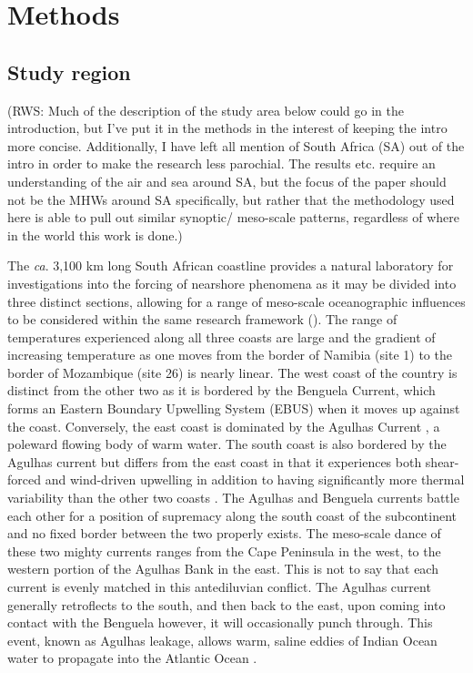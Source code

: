 \documentclass[a4paper,10pt,review]{elsarticle}
\begin{document}
\section{Methods}
\subsection{Study region}
(RWS: Much of the description of the study area below could go in the introduction, but I've put it in the methods in the interest of keeping the intro more concise. Additionally, I have left all mention of South Africa (SA) out of the intro in order to make the research less parochial. The results etc. require an understanding of the air and sea around SA, but the focus of the paper should not be the MHWs around SA specifically, but rather that the methodology used here is able to pull out similar synoptic/ meso-scale patterns, regardless of where in the world this work is done.)

The \emph{ca}. 3,100 km long South African coastline provides a natural laboratory for investigations into the forcing of nearshore phenomena as it may be divided into three distinct sections, allowing for a range of meso-scale oceanographic influences to be considered within the same research framework (). The range of temperatures experienced along all three coasts are large and the gradient of increasing temperature as one moves from the border of Namibia (site 1) to the border of Mozambique (site 26) is nearly linear. The west coast of the country is distinct from the other two as it is bordered by the Benguela Current, which forms an Eastern Boundary Upwelling System (EBUS) \citep{Hutchings2009} when it moves up against the coast. Conversely, the east coast is dominated by the Agulhas Current \citep{Luning1990}, a poleward flowing body of warm water. The south coast is also bordered by the Agulhas current but differs from the east coast in that it experiences both shear-forced and wind-driven upwelling \citep{Lutjeharms2000a} in addition to having significantly more thermal variability than the other two coasts \citep{Schlegel2017}. The Agulhas and Benguela currents battle each other for a position of supremacy along the south coast of the subcontinent and no fixed border between the two properly exists. The meso-scale dance of these two mighty currents ranges from the Cape Peninsula in the west, to the western portion of the Agulhas Bank in the east. This is not to say that each current is evenly matched in this antediluvian conflict. The Agulhas current generally retroflects to the south, and then back to the east, upon coming into contact with the Benguela \citep{Hutchings2009} however, it will occasionally punch through. This event, known as Agulhas leakage, allows warm, saline eddies of Indian Ocean water to propagate into the Atlantic Ocean \citep{Beal2011}.
\end{document}
